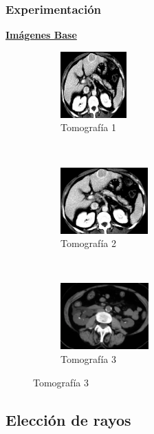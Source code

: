 \documentclass{beamer}
\begin{document}
\begin{frame}
\frametitle{Experimentación}
\textbf{\underline{Imágenes Base}}
\begin{figure}[H]
	\centering
  \begin{subfigure}[t]{0.3\textwidth}
      \centering
      \includegraphics[height=1.0in]{imagenes/tomo.png}
      \caption{Tomografía 1}
  \end{subfigure}
  ~ 
  \begin{subfigure}[t]{0.3\textwidth}
      \centering
      \includegraphics[height=1.0in]{imagenes/tomo2.png}
      \caption{Tomografía 2}
  \end{subfigure}
  ~ 
  \begin{subfigure}[t]{0.3\textwidth}
      \centering
      \includegraphics[height=1.0in]{imagenes/tomo3.png}
      \caption{Tomografía 3}
  \end{subfigure}
\end{figure}
\end{frame}

\subsection{Elección de rayos}
\end{document}
